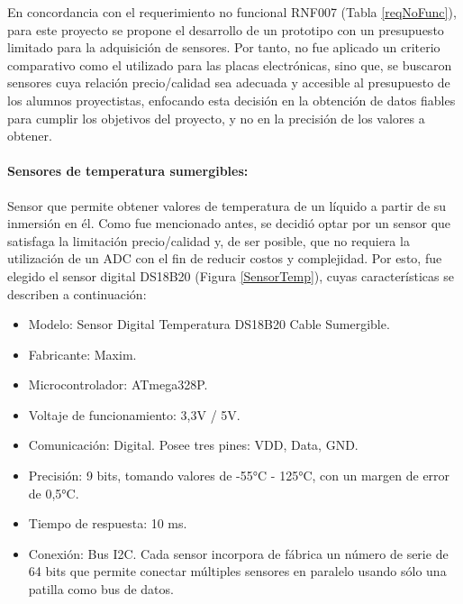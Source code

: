             \par En concordancia con el requerimiento no funcional RNF007 (Tabla \ref{reqNoFunc}), para este proyecto se propone el desarrollo de un prototipo con un presupuesto limitado para la adquisición de sensores. Por tanto, no fue aplicado un criterio comparativo como el utilizado para las placas electrónicas, sino que, se buscaron sensores cuya relación precio/calidad sea adecuada y accesible al presupuesto de los alumnos proyectistas, enfocando esta decisión en la obtención de datos fiables para cumplir los objetivos del proyecto, y no en la precisión de los valores a obtener.
            
            \paragraph{Sensores de temperatura sumergibles:}Sensor que permite obtener valores de temperatura de un líquido a partir de su inmersión en él. Como fue mencionado antes, se decidió optar por un sensor que satisfaga la limitación precio/calidad y, de ser posible, que no requiera la utilización de un ADC con el fin de reducir costos y complejidad. Por esto, fue elegido el sensor digital DS18B20 (Figura \ref{SensorTemp}), cuyas características se describen a continuación:
            
                \begin{itemize}
                    \item Modelo: Sensor Digital Temperatura DS18B20 Cable Sumergible.
                    \item Fabricante: Maxim.
                    \item Microcontrolador: ATmega328P.
                    \item Voltaje de funcionamiento: 3,3V / 5V.
                    \item Comunicación: Digital. Posee tres pines: VDD, Data, GND.
                    \item Precisión: 9 bits, tomando valores de -55°C - 125°C, con un margen de error de 0,5°C.
                    \item Tiempo de respuesta: 10 ms.
                    \item Conexión: Bus I2C. Cada sensor incorpora de fábrica un número de serie de 64 bits que permite conectar múltiples sensores en paralelo usando sólo una patilla como bus de datos.
                \end{itemize}
                
